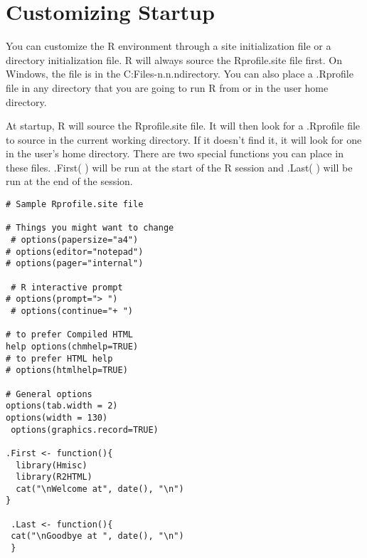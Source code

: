 \section{Customizing Startup}

You can customize the R environment through a site initialization file or a directory initialization file. 
R will always source the Rprofile.site file first. 
On Windows, the file is in the C:\Program Files\R\R-n.n.n\etc directory. You can also place a .Rprofile file in any directory that you are going to run R from or in the user home directory. 

At startup, R will source the Rprofile.site file. 
It will then look for a .Rprofile file to source in the current working directory. 
If it doesn't find it, it will look for one in the user's home directory. There are two special functions you can place in these files. .First( ) will be run at the start of the R session and .Last( ) will be run at the end of the session. 

\begin{verbatim}
# Sample Rprofile.site file 

# Things you might want to change
 # options(papersize="a4") 
# options(editor="notepad") 
# options(pager="internal")

 # R interactive prompt 
# options(prompt="> ")
 # options(continue="+ ") 

# to prefer Compiled HTML 
help options(chmhelp=TRUE) 
# to prefer HTML help 
# options(htmlhelp=TRUE) 

# General options 
options(tab.width = 2) 
options(width = 130)
 options(graphics.record=TRUE) 

.First <- function(){
  library(Hmisc)
  library(R2HTML)
  cat("\nWelcome at", date(), "\n") 
}

 .Last <- function(){ 
 cat("\nGoodbye at ", date(), "\n")
 }

\end{verbatim}



